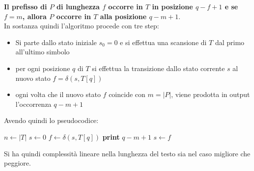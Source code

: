 \documentclass[a4paper,12pt, oneside]{book}
\begin{document}
\begin{center}
\end{center}
\textbf{Il prefisso di $P$ di lunghezza $f$ occorre in $T$ in posizione
  $q-f+1$ e se $f = m$, allora $P$ occorre in $T$ alla posizione $q-m+1$}.\\
In sostanza quindi l'algoritmo procede con tre step:
\begin{itemize}
  \item Si  parte dallo stato iniziale $s_0=0$  e si effettua una scansione di
  $T$ dal primo all’ultimo simbolo
  \item per ogni posizione $q$ di $T$ si effettua la transizione dallo stato
  corrente $s$ al nuovo stato $f = \delta(s,T[q])$ 
  \item ogni volta che il nuovo stato $f$ coincide con $m=|P|$, viene prodotta
  in output l’occorrenza $q-m+1$  
\end{itemize}
Avendo quindi lo pseudocodice:
\begin{algorithm}
  \begin{algorithmic}
    \State $n\gets|T|$
    \State $s\gets 0$
    \State $f\gets \delta(s, T[q])$
    \State \textbf{print} $q-m+1$
    \EndIf
    \State $s\gets f$
    \EndFor
    \EndFunction
  \end{algorithmic}
\end{algorithm}
Si ha quindi complessità lineare nella lunghezza del testo sia nel caso migliore
che peggiore.
\end{document}
